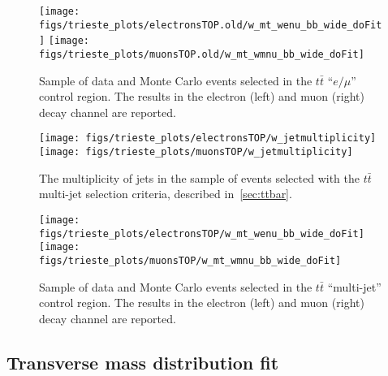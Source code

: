 \begin{figure}[htb]
        \begin{center}
                \leavevmode
                \texttt{[image: figs/trieste\_plots/electronsTOP.old/w\_mt\_wenu\_bb\_wide\_doFit]}
                \texttt{[image: figs/trieste\_plots/muonsTOP.old/w\_mt\_wmnu\_bb\_wide\_doFit]}
        \end{center}
        \caption{Sample of data and Monte Carlo events selected in the $t\bar{t}$ ``$e/\mu$'' control region.
          The results in the electron (left) and muon (right) decay channel are reported.}
        \label{fig:ttbarFitemu}
\end{figure}

\begin{figure}[htb]
        \begin{center}
                \leavevmode
                \texttt{[image: figs/trieste\_plots/electronsTOP/w\_jetmultiplicity]}
                \texttt{[image: figs/trieste\_plots/muonsTOP/w\_jetmultiplicity]}
        \end{center}
        \caption{The multiplicity of jets in the sample
          of events selected with the $t\bar{t}$ multi-jet selection
          criteria, described in~\ref{sec:ttbar}.}
        \label{fig:jetmultiplicity}
\end{figure}

\begin{figure}[htb]
        \begin{center}
                \leavevmode
                \texttt{[image: figs/trieste\_plots/electronsTOP/w\_mt\_wenu\_bb\_wide\_doFit]}
                \texttt{[image: figs/trieste\_plots/muonsTOP/w\_mt\_wmnu\_bb\_wide\_doFit]}
        \end{center}
        \caption{Sample of data and Monte Carlo events selected in the $t\bar{t}$ ``multi-jet'' control region.
          The results in the electron (left) and muon (right) decay channel are reported.}
        \label{fig:ttbarFitmultijet}
\end{figure}

\subsection{Transverse mass distribution fit}
\label{sec:transversemassfit}

